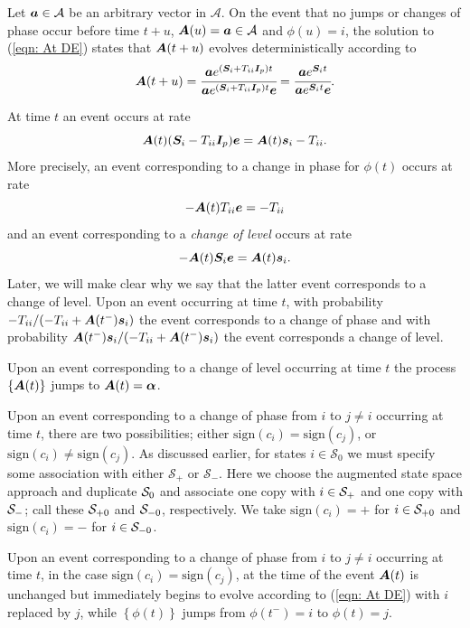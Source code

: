 Let \(\boldsymbol a \in{}\mathcal A\) be an arbitrary vector in \(\mathcal A\). On the event that no jumps or changes of phase occur before time \(t+u\), \(\boldsymbol A(u) = \boldsymbol a\in\mathcal A\) and \({\phi}(u)=i\), the solution to (\ref{eqn: At DE}) states that \(\boldsymbol A({t+u})\) evolves deterministically according to 
\[\boldsymbol A({t+u}) =  \cfrac{\boldsymbol a e^{(\boldsymbol{S}_i+T_{ii}\boldsymbol{I}_p)t}}{\boldsymbol a e^{(\boldsymbol{S}_i+T_{ii}\boldsymbol{I}_p)t} \boldsymbol e} = \cfrac{\boldsymbol a e^{\boldsymbol{S}_i t}}{\boldsymbol a e^{\boldsymbol{S}_i t} \boldsymbol e}.\] 

At time \(t\) an event occurs at rate 
\[\boldsymbol A(t) (\boldsymbol{S}_i - T_{ii}\boldsymbol{I}_p)\boldsymbol e = \boldsymbol A(t)\boldsymbol s_i - T_{ii}.\]
More precisely, an event corresponding to a change in phase for \({\phi}(t)\) occurs at rate \[-\boldsymbol A(t) T_{ii}\boldsymbol e = -T_{ii}\] and an event corresponding to a \emph{change of level} occurs at rate \[-\boldsymbol A(t) \boldsymbol{S}_i\boldsymbol e = \boldsymbol A(t) \boldsymbol s_i.\] Later, we will make clear why we say that the latter event corresponds to a change of level. Upon an event occurring at time \(t\), with probability \({-T_{ii}}/{\left(-T_{ii} + \boldsymbol A({t^-})\boldsymbol s_i\right)}\) the event corresponds to a change of phase and with probability \({\boldsymbol A({t^-})\boldsymbol s_i}/{\left(-T_{ii} + \boldsymbol A({t^-})\boldsymbol s_i\right)}\) the event corresponds a change of level. 

Upon an event corresponding to a change of level occurring at time \(t\) the process \(\{\boldsymbol A(t)\}\) jumps to
\(\boldsymbol A(t) = \boldsymbol \alpha\). 

Upon an event corresponding to a change of phase from \(i\) to \(j\neq i\) occurring at time \(t\), there are two possibilities; either \(\mathrm{sign}(c_i)=\mathrm{sign}(c_j)\), or \(\mathrm{sign}(c_i)\neq \mathrm{sign}(c_j)\). As discussed earlier, for states \(i\in\mathcal S_0\) we must specify some association with either \(\mathcal S_+\) or \(\mathcal S_-\). Here we choose the augmented state space approach and duplicate \(\mathcal{S}_0\) and associate one copy with \(i\in\mathcal{S}_+\) and one copy with \(\mathcal{S}_-\); call these \(\mathcal{S}_{+0}\) and \(\mathcal{S}_{-0}\), respectively. We take \(\mathrm{sign}(c_i)=+\) for \(i\in\mathcal{S}_{+0}\) and \(\mathrm{sign}(c_i)=-\) for \(i\in\mathcal{S}_{-0}\).

Upon an event corresponding to a change of phase from \(i\) to \(j\neq i\) occurring at time \(t\), in the case \(\mathrm{sign}(c_i)=\mathrm{sign}(c_j)\), at the time of the event \(\boldsymbol A(t)\) is unchanged but immediately begins to evolve according to (\ref{eqn: At DE}) with \(i\) replaced by \(j\), while \(\left\{{\phi}(t)\right\}\) jumps from \({\phi}(t^-)=i\) to \({\phi}(t)=j\). 

